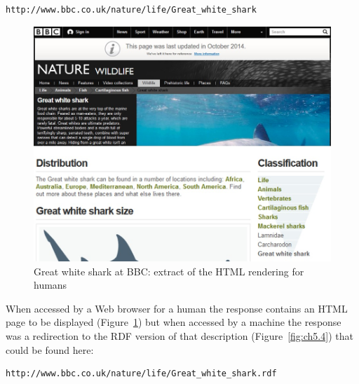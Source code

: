 \begin{lstlisting}
http://www.bbc.co.uk/nature/life/Great_white_shark
\end{lstlisting}

\begin{figure}
    \centering
     \includegraphics[width=5.0in]{media/ch5/figure-05-03.jpg}
    \caption{Great white shark at BBC: extract of the HTML rendering for
humans}
    \label{fig:ch5.3}
\end{figure}


When accessed by a Web browser for a human the response contains an HTML
page to be displayed (Figure~\ref{fig:ch5.3}) but when accessed by a machine the
response was a redirection to the RDF version of that description
(Figure~\ref{fig:ch5.4}) that could be found here:


\begin{lstlisting}
http://www.bbc.co.uk/nature/life/Great_white_shark.rdf
\end{lstlisting}

